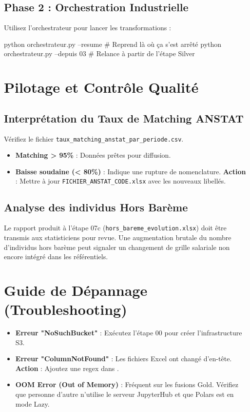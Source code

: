 \documentclass[12pt,a4paper,french]{article}
\begin{document}
\subsection{Phase 2 : Orchestration Industrielle}
Utilisez l'orchestrateur pour lancer les transformations :
\begin{codebox}[]
python orchestrateur.py --resume   \# Reprend là où ça s'est arrêté
python orchestrateur.py --depuis 03 \# Relance à partir de l'étape Silver
\end{codebox}

\section{Pilotage et Contrôle Qualité}

\subsection{Interprétation du Taux de Matching ANSTAT}
Vérifiez le fichier \texttt{taux\_matching\_anstat\_par\_periode.csv}.
\begin{itemize}
    \item \textbf{Matching > 95\%} : Données prêtes pour diffusion.
    \item \textbf{Baisse soudaine (< 80\%)} : Indique une rupture de nomenclature. \textbf{Action} : Mettre à jour \texttt{FICHIER\_ANSTAT\_CODE.xlsx} avec les nouveaux libellés.
\end{itemize}

\subsection{Analyse des individus Hors Barème}
Le rapport produit à l'étape 07c (\texttt{hors\_bareme\_evolution.xlsx}) doit être transmis aux statisticiens pour revue. Une augmentation brutale du nombre d'individus hors barème peut signaler un changement de grille salariale non encore intégré dans les référentiels.

\section{Guide de Dépannage (Troubleshooting)}

\begin{itemize}
    \item \textbf{Erreur "NoSuchBucket"} : Exécutez l'étape 00 pour créer l'infrastructure S3.
    \item \textbf{Erreur "ColumnNotFound"} : Les fichiers Excel ont changé d'en-tête. \textbf{Action} : Ajoutez une regex dans .
    \item \textbf{OOM Error (Out of Memory)} : Fréquent sur les fusions Gold. Vérifiez que personne d'autre n'utilise le serveur JupyterHub et que Polars est en mode Lazy.
\end{itemize}
\end{document}

